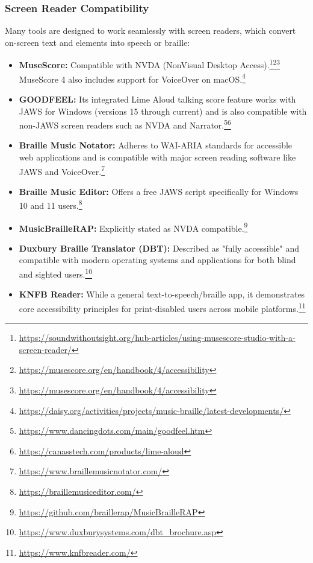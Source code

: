 \subsubsection{Screen Reader Compatibility}
Many tools are designed to work seamlessly with screen readers, which convert on-screen text and elements into speech or braille:
\begin{itemize}[noitemsep,topsep=0pt]
    \item \textbf{MuseScore:} Compatible with NVDA (NonVisual Desktop Access).\footnote{\url{https://soundwithoutsight.org/hub-articles/using-musescore-studio-with-a-screen-reader/}}\footnote{\url{https://musescore.org/en/handbook/4/accessibility}}\footnote{\url{https://musescore.org/en/handbook/4/accessibility}} MuseScore 4 also includes support for VoiceOver on macOS.\footnote{\url{https://daisy.org/activities/projects/music-braille/latest-developments/}}
    \item \textbf{GOODFEEL:} Its integrated Lime Aloud talking score feature works with JAWS for Windows (versions 15 through current) and is also compatible with non-JAWS screen readers such as NVDA and Narrator.\footnote{\url{https://www.dancingdots.com/main/goodfeel.htm}}\footnote{\url{https://canasstech.com/products/lime-aloud}}
    \item \textbf{Braille Music Notator:} Adheres to WAI-ARIA standards for accessible web applications and is compatible with major screen reading software like JAWS and VoiceOver.\footnote{\url{https://www.braillemusicnotator.com/}}
    \item \textbf{Braille Music Editor:} Offers a free JAWS script specifically for Windows 10 and 11 users.\footnote{\url{https://braillemusiceditor.com/}}
    \item \textbf{MusicBrailleRAP:} Explicitly stated as NVDA compatible.\footnote{\url{https://github.com/braillerap/MusicBrailleRAP}}
    \item \textbf{Duxbury Braille Translator (DBT):} Described as "fully accessible" and compatible with modern operating systems and applications for both blind and sighted users.\footnote{\url{https://www.duxburysystems.com/dbt_brochure.asp}}
    \item \textbf{KNFB Reader:} While a general text-to-speech/braille app, it demonstrates core accessibility principles for print-disabled users across mobile platforms.\footnote{\url{https://www.knfbreader.com/}}
\end{itemize}

